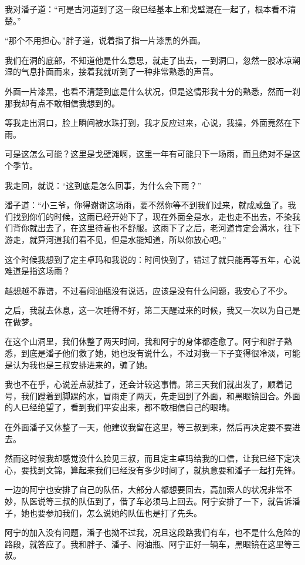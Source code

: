 我对潘子道：“可是古河道到了这一段已经基本上和戈壁混在一起了，根本看不清楚。”

“那个不用担心。”胖子道，说着指了指一片漆黑的外面。

我们在洞的底部，不知道他是什么意思，就走了出去，一到洞口，忽然一股冰凉潮湿的气息扑面而来，接着我就听到了一种非常熟悉的声音。

外面一片漆黑，也看不清楚到底是什么状况，但是这情形我十分的熟悉，然而一刹那我却有点不敢相信我想到的。

等我走出洞口，脸上瞬间被水珠打到，我才反应过来，心说，我操，外面竟然在下雨。

可是这怎么可能？这里是戈壁滩啊，这里一年有可能只下一场雨，而且绝对不是这个季节。

我走回，就说：“这到底是怎么回事，为什么会下雨？”

潘子道：“小三爷，你得谢谢这场雨，要不然你等不到我们过来，就成咸鱼了。我们找到你们的时候，这雨已经开始下了，现在外面全是水，走也走不出去，不染我们背你就出去了，在这里待着也不舒服。这雨下了之后，老河道肯定会满水，往下游走，就算河道我们看不见，但是水能知道，所以你放心吧。”

这个时候我想到了定主卓玛和我说的：时间快到了，错过了就只能再等五年，心说难道是指这场雨？

越想越不靠谱，不过看闷油瓶没有说话，应该是没有什么问题，我安心了不少。

之后，我就去休息，这一次睡得不好，第二天醒过来的时候，我又一次以为自己是在做梦。

在这个山洞里，我们休整了两天时间，我和阿宁的身体都痊愈了。阿宁和胖子熟悉，到底是潘子他们救了她，她也没有说什么，不过对我一下子变得很冷淡，可能是认为我也是三叔安排进来的，骗了她。

我也不在乎，心说差点就挂了，还会计较这事情。第三天我们就出发了，顺着记号，我们蹚着到脚踝的水，冒雨走了两天，先走回到了外面，和黑眼镜回合。外面的人已经绝望了，看到我们平安出来，都不敢相信自己的眼睛。

在外面潘子又休整了一天，他建议我留在这里，等三叔到来，然后再决定要不要进去。

然而这时候我却感觉没什么脸见三叔，而且定主卓玛给我的口信，让我已经下定决心，要找到文锦，算起来我们已经没有多少时间了，就执意要和潘子一起打先锋。

一边的阿宁也安排了自己的队伍，大部分人都想要回去，高加索人的状况非常不妙，队医说等三叔的队伍到了，借了车必须马上回去。阿宁安排了一下，就告诉潘子，她也要参加我们，怎么说她的队伍也是打了先头。

阿宁的加入没有问题，潘子也拗不过我，况且这段路我们有车，也不是什么危险的路段，就答应了。我和胖子、潘子、闷油瓶、阿宁正好一辆车，黑眼镜在这里等三叔。

